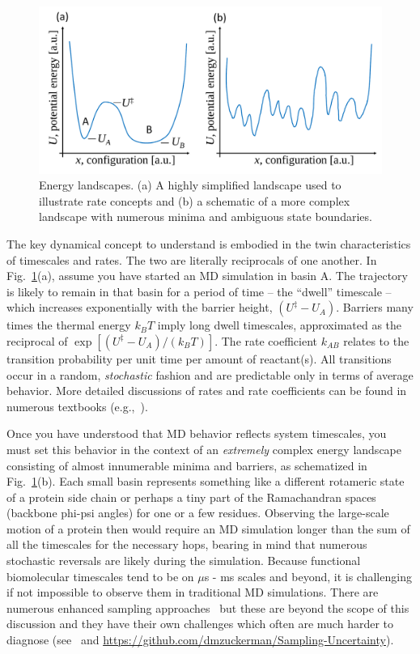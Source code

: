 \documentclass[9pt,bestpractices]{livecoms}
\begin{document}
\begin{figure}[h]
\centering
\includegraphics[width=\linewidth]{simplelandscapes.pdf}
\caption{Energy landscapes.  (a) A highly simplified landscape used to illustrate rate concepts and (b) a schematic of a more complex landscape with numerous minima and ambiguous state boundaries.}
\label{landscapes}
\end{figure}

The key dynamical concept to understand is embodied in the twin characteristics of timescales and rates.
The two are literally reciprocals of one another.
In Fig.\ \ref{landscapes}(a), assume you have started an MD simulation in basin A.
The trajectory is likely to remain in that basin for a period of time -- the ``dwell'' timescale -- which increases exponentially with the barrier height, $(U^\ddagger - U_A)$.
Barriers many times the thermal energy $k_BT$ imply long dwell timescales, approximated as the reciprocal of $\exp[(U^\ddagger - U_A)/(k_B T)]$.
The rate coefficient $k_{AB}$ relates to the transition probability per unit time per amount of reactant(s).
All transitions occur in a random, \emph{stochastic} fashion and are predictable only in terms of average behavior.
More detailed discussions of rates and rate coefficients can be found in numerous textbooks (e.g.,~\cite{DillBook, Zuckerman:2010:}).

Once you have understood that MD behavior reflects system timescales, you must set this behavior in the context of an \emph{extremely} complex energy landscape consisting of almost innumerable minima and barriers, as schematized in Fig.\ \ref{landscapes}(b).
Each small basin represents something like a different rotameric state of a protein side chain or perhaps a tiny part of the Ramachandran spaces (backbone phi-psi angles) for one or a few residues.
Observing the large-scale motion of a protein then would require an MD simulation longer than the sum of all the timescales for the necessary hops, bearing in mind that numerous stochastic reversals are likely during the simulation.
Because functional biomolecular timescales tend to be on $\mu$s - ms scales and beyond, it is challenging if not impossible to observe them in traditional MD simulations.
There are numerous enhanced sampling approaches~\cite{Zuckerman:2011:AnnuRevBiophys, Chong:2017:CurrentOpinioninStructuralBiology} but these are beyond the scope of this discussion and they have their own challenges which often are much harder to diagnose (see~\cite{Grossfield:2009:AnnuRepComputChem} and  \url{https://github.com/dmzuckerman/Sampling-Uncertainty}).
\end{document}

